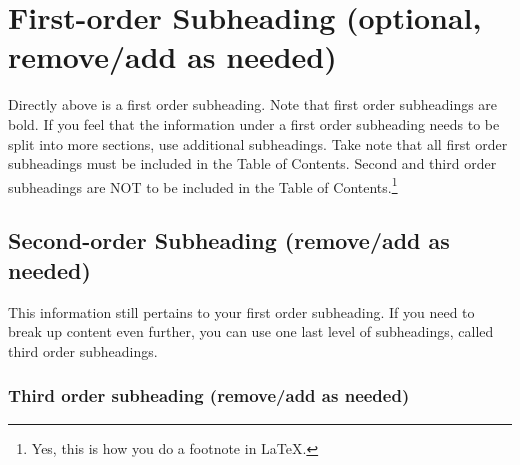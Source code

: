 \section{First-order Subheading (optional, remove/add as needed)} %

\vspace{-0.4em} %

\renewcommand*{\thefootnote}{\fnsymbol{footnote}} %

\indent \indent Directly above is a first order subheading. Note that first order subheadings are bold.  If you feel that the information under a first order subheading needs to be split into more sections, use additional subheadings. Take note that all first order subheadings must be included in the Table of Contents. Second and third order subheadings are NOT to be included in the Table of Contents.\footnote {Yes, this is how you do a footnote in LaTeX.}


\subsection{Second-order Subheading (remove/add as needed)} %


\indent \indent This information still pertains to your first order subheading. If you need to break up content even further, you can use one last level of subheadings, called third order subheadings.

\subsubsection{Third order subheading (remove/add as needed)}


